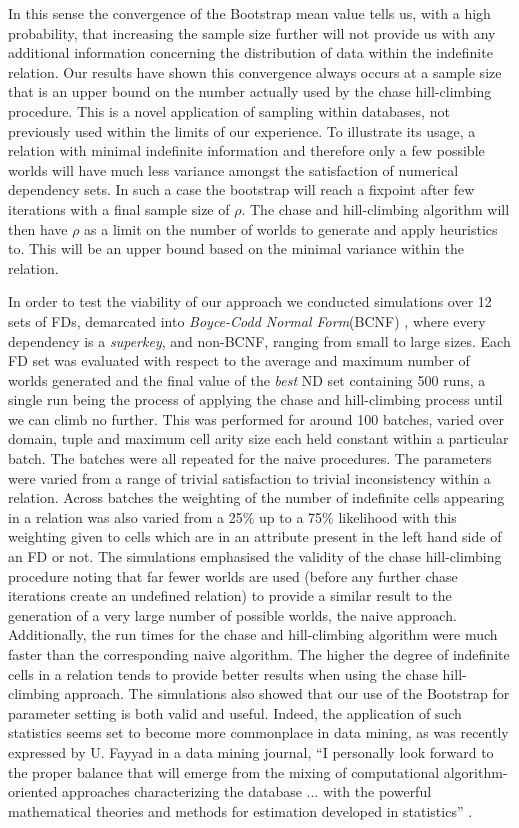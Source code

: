 In this sense the convergence of the Bootstrap mean value
tells us, with a high probability, that
increasing the sample size further will not provide us with any
additional information concerning the distribution of data within the
indefinite relation. Our 
results have shown this convergence always occurs at a sample size 
that is an upper bound on the 
number actually used by the chase hill-climbing procedure. This is a novel
application of sampling within databases, not previously used within
the limits of our experience.  To illustrate its usage, a relation with 
minimal indefinite information and therefore only
a few possible worlds will have much less variance amongst the satisfaction
of numerical dependency sets. In such a case the bootstrap will reach
a fixpoint after few iterations with a final sample size of $\rho$. The
chase and hill-climbing
algorithm will then have $\rho$ as a limit on the number of worlds to generate and
apply heuristics to. This will be an upper bound based on the minimal
variance within the relation.

\smallskip

In order to test the viability of our approach we conducted simulations
over 12 sets of FDs, demarcated into {\em Boyce-Codd Normal
Form}(BCNF) \cite{Mann92}, where every dependency is a {\em superkey},
and non-BCNF, ranging from small to large sizes. 
 Each FD set was evaluated with respect to the average and maximum number
of worlds generated and the final value of the {\em best} ND set
containing 500 runs, a single run being the process of applying the
chase and hill-climbing process until we can climb no further.
This was performed for around 100 batches, varied over domain, tuple
and maximum cell arity size each held constant within a
particular batch. The batches were all repeated for the naive procedures. The
parameters 
were varied from a range of trivial satisfaction to trivial inconsistency
within a relation. Across batches the weighting of the number of 
indefinite cells appearing in a relation was also varied from a 25\%
 up to a 75\% likelihood with this weighting given to cells which are
in an attribute present in the left hand side of an FD or not.
The simulations
emphasised the validity of the chase hill-climbing procedure noting that
far fewer worlds are used (before any further chase iterations create
an undefined relation) to provide a similar result to the generation of
a very large number of possible worlds, the naive
approach. Additionally, the run times for the chase and hill-climbing
algorithm were much faster than the corresponding naive algorithm. The higher
the degree of indefinite cells in a relation tends to provide better
results when using the chase hill-climbing approach.
 The simulations also showed that our
use of the Bootstrap for parameter setting is both valid and useful.
Indeed, the application of such statistics seems set to become more
commonplace in data mining, as was recently expressed by U. Fayyad in
a data mining journal, ``I personally look forward to the
proper balance that
will emerge from the mixing of computational algorithm-oriented
approaches characterizing the database ... with the powerful
mathematical theories and methods for estimation developed in statistics''
\cite{fay98}.

